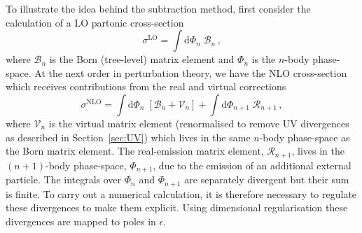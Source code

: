 \documentclass[main.tex]{subfiles}
\begin{document}
    To illustrate the idea behind the subtraction method,
    first consider the calculation of a LO partonic cross-section
    \begin{equation}\label{eqn:LO_cs}
        \sigma^{\mathrm{LO}} = \int \mathrm{d}\Phi_{n} \; \mathcal{B}_{n} \, ,
    \end{equation}
    where $\mathcal{B}_{n}$ is the Born (tree-level) matrix
    element and $\Phi_{n}$ is the $n$-body phase-space.
    At the next order in perturbation theory, we have the NLO
    cross-section which receives contributions from the real and virtual
    corrections
    \begin{equation}\label{eqn:NLO_cs}
        \sigma^{\mathrm{NLO}} = \int \mathrm{d}\Phi_{n} \; \left[\mathcal{B}_{n} + \mathcal{V}_{n}\right] + \int \mathrm{d}\Phi_{n+1} \; \mathcal{R}_{n+1} \, ,
    \end{equation}
    where $\mathcal{V}_{n}$ is the virtual matrix element (renormalised
    to remove UV divergences as described in Section~\ref{sec:UV})
    which lives in the same $n$-body phase-space as the Born
    matrix element. The real-emission matrix element, $\mathcal{R}_{n+1}$,
    lives in the $(n+1)$-body phase-space, $\Phi_{n+1}$, due to the emission
    of an additional external particle. The integrals over $\Phi_{n}$ and
    $\Phi_{n+1}$ are separately divergent but their sum is finite. To
    carry out a numerical calculation, it is therefore necessary
    to regulate these divergences to make them explicit.
    Using dimensional regularisation these
    divergences are mapped to poles in $\epsilon$.
\end{document}
